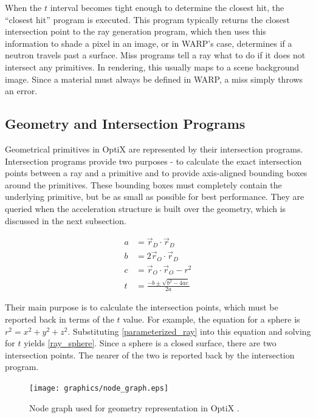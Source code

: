 When the $t$ interval becomes tight enough to determine the closest hit, the ``closest hit'' program is executed.  This program typically returns the closest intersection point to the ray generation program, which then uses this information to shade a pixel in an image, or in WARP's case, determines if a neutron travels past a surface.  Miss programs tell a ray what to do if it does not intersect any primitives.  In rendering, this usually maps to a scene background image.  Since a material must always be defined in WARP, a miss simply throws an error.

\subsection{Geometry and Intersection Programs}

Geometrical primitives in OptiX are represented by their intersection programs.  Intersection programs provide two purposes - to calculate the exact intersection points between a ray and a primitive and to provide axis-aligned bounding boxes around the primitives.  These bounding boxes must completely contain the underlying primitive, but be as small as possible for best performance.  They are queried when the acceleration structure is built over the geometry, which is discussed in the next subsection.  

\begin{equation}
\label{ray_sphere}
\begin{split}
a &= \vec{r}_D \cdot \vec{r}_D \\
b &= 2 \vec{r}_O \cdot \vec{r}_D \\
c &= \vec{r}_O \cdot \vec{r}_O - r^2 \\
t &= \frac{-b \pm \sqrt{b^2-4ac}}{2a}
\end{split}
\end{equation}

Their main purpose is to calculate the intersection points, which must be reported back in terms of the $t$ value.  For example, the equation for a sphere is $r^2=x^2+y^2+z^2$.  Substituting \eqref{parameterized_ray} into this equation and solving for $t$ yields \eqref{ray_sphere}.  Since a sphere is a closed surface, there are two intersection points.  The nearer of the two is reported back by the intersection program.

 \begin{figure}[h!] 
  \centering
    \texttt{[image: graphics/node\_graph.eps]}
     \caption{Node graph used for geometry representation in OptiX \cite{optix}. \label{node_graph}}
\end{figure}

